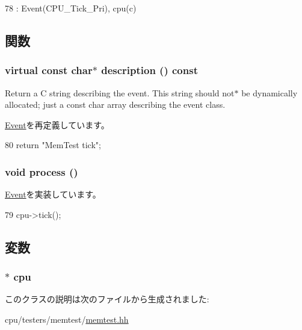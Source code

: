 \begin{DoxyCode}
78 : Event(CPU_Tick_Pri), cpu(c) {}
\end{DoxyCode}


\subsection{関数}
\hypertarget{classMemTest_1_1TickEvent_a130ddddf003422b413e2e891b1b80e8f}{
\subsubsection[{description}]{\setlength{\rightskip}{0pt plus 5cm}virtual const char$\ast$ description () const}}
\label{classMemTest_1_1TickEvent_a130ddddf003422b413e2e891b1b80e8f}
Return a C string describing the event. This string should not$\ast$ be dynamically allocated; just a const char array describing the event class. 

\hyperlink{classEvent_a130ddddf003422b413e2e891b1b80e8f}{Event}を再定義しています。


\begin{DoxyCode}
80 { return "MemTest tick"; }
\end{DoxyCode}
\hypertarget{classMemTest_1_1TickEvent_a2e9c5136d19b1a95fc427e0852deab5c}{
\subsubsection[{process}]{\setlength{\rightskip}{0pt plus 5cm}void process ()}}
\label{classMemTest_1_1TickEvent_a2e9c5136d19b1a95fc427e0852deab5c}


\hyperlink{classEvent_a142b75b68a6291400e20fb0dd905b1c8}{Event}を実装しています。


\begin{DoxyCode}
79 { cpu->tick(); }
\end{DoxyCode}


\subsection{変数}
\hypertarget{classMemTest_1_1TickEvent_a2f5bd13202a0967a012fbb8cfe08ccc5}{
\subsubsection[{cpu}]{$\ast$ {\bf cpu}}}
\label{classMemTest_1_1TickEvent_a2f5bd13202a0967a012fbb8cfe08ccc5}


このクラスの説明は次のファイルから生成されました:\begin{DoxyCompactItemize}
\item 
cpu/testers/memtest/\hyperlink{memtest_8hh}{memtest.hh}\end{DoxyCompactItemize}
